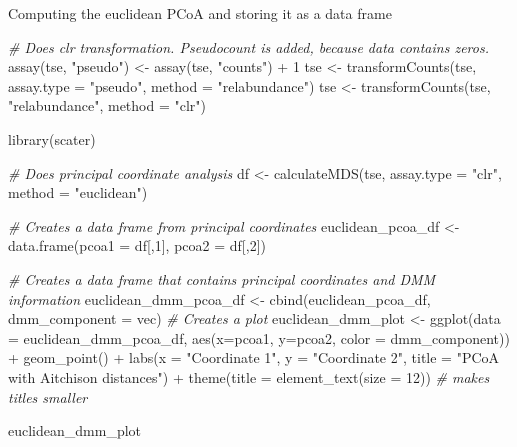 \documentclass[
]{book}
\newenvironment{Shaded}{\begin{snugshade}}{\end{snugshade}}
\newcommand{\AttributeTok}[1]{\textcolor[rgb]{0.77,0.63,0.00}{#1}}
\newcommand{\CommentTok}[1]{\textcolor[rgb]{0.56,0.35,0.01}{\textit{#1}}}
\newcommand{\DecValTok}[1]{\textcolor[rgb]{0.00,0.00,0.81}{#1}}
\newcommand{\FunctionTok}[1]{\textcolor[rgb]{0.00,0.00,0.00}{#1}}
\newcommand{\NormalTok}[1]{#1}
\newcommand{\OtherTok}[1]{\textcolor[rgb]{0.56,0.35,0.01}{#1}}
\newcommand{\SpecialCharTok}[1]{\textcolor[rgb]{0.00,0.00,0.00}{#1}}
\newcommand{\StringTok}[1]{\textcolor[rgb]{0.31,0.60,0.02}{#1}}
\begin{document}
Computing the euclidean PCoA and storing it as a data frame

\begin{Shaded}
\begin{Highlighting}[]
\CommentTok{\# Does clr transformation. Pseudocount is added, because data contains zeros.}
\FunctionTok{assay}\NormalTok{(tse, }\StringTok{"pseudo"}\NormalTok{) }\OtherTok{\textless{}{-}} \FunctionTok{assay}\NormalTok{(tse, }\StringTok{"counts"}\NormalTok{) }\SpecialCharTok{+} \DecValTok{1}
\NormalTok{tse }\OtherTok{\textless{}{-}} \FunctionTok{transformCounts}\NormalTok{(tse, }\AttributeTok{assay.type =} \StringTok{"pseudo"}\NormalTok{, }\AttributeTok{method =} \StringTok{"relabundance"}\NormalTok{)}
\NormalTok{tse }\OtherTok{\textless{}{-}} \FunctionTok{transformCounts}\NormalTok{(tse, }\StringTok{"relabundance"}\NormalTok{, }\AttributeTok{method =} \StringTok{"clr"}\NormalTok{)}

\FunctionTok{library}\NormalTok{(scater)}

\CommentTok{\# Does principal coordinate analysis}
\NormalTok{df }\OtherTok{\textless{}{-}} \FunctionTok{calculateMDS}\NormalTok{(tse, }\AttributeTok{assay.type =} \StringTok{"clr"}\NormalTok{, }\AttributeTok{method =} \StringTok{"euclidean"}\NormalTok{)}

\CommentTok{\# Creates a data frame from principal coordinates}
\NormalTok{euclidean\_pcoa\_df }\OtherTok{\textless{}{-}} \FunctionTok{data.frame}\NormalTok{(}\AttributeTok{pcoa1 =}\NormalTok{ df[,}\DecValTok{1}\NormalTok{], }
                                \AttributeTok{pcoa2 =}\NormalTok{ df[,}\DecValTok{2}\NormalTok{])}
\end{Highlighting}
\end{Shaded}

\begin{Shaded}
\begin{Highlighting}[]
\CommentTok{\# Creates a data frame that contains principal coordinates and DMM information}
\NormalTok{euclidean\_dmm\_pcoa\_df }\OtherTok{\textless{}{-}} \FunctionTok{cbind}\NormalTok{(euclidean\_pcoa\_df,}
                               \AttributeTok{dmm\_component =}\NormalTok{ vec)}
\CommentTok{\# Creates a plot}
\NormalTok{euclidean\_dmm\_plot }\OtherTok{\textless{}{-}} \FunctionTok{ggplot}\NormalTok{(}\AttributeTok{data =}\NormalTok{ euclidean\_dmm\_pcoa\_df, }
                             \FunctionTok{aes}\NormalTok{(}\AttributeTok{x=}\NormalTok{pcoa1, }\AttributeTok{y=}\NormalTok{pcoa2,}
                                 \AttributeTok{color =}\NormalTok{ dmm\_component)) }\SpecialCharTok{+}
  \FunctionTok{geom\_point}\NormalTok{() }\SpecialCharTok{+}
  \FunctionTok{labs}\NormalTok{(}\AttributeTok{x =} \StringTok{"Coordinate 1"}\NormalTok{,}
       \AttributeTok{y =} \StringTok{"Coordinate 2"}\NormalTok{,}
       \AttributeTok{title =} \StringTok{"PCoA with Aitchison distances"}\NormalTok{) }\SpecialCharTok{+}  
  \FunctionTok{theme}\NormalTok{(}\AttributeTok{title =} \FunctionTok{element\_text}\NormalTok{(}\AttributeTok{size =} \DecValTok{12}\NormalTok{)) }\CommentTok{\# makes titles smaller}

\NormalTok{euclidean\_dmm\_plot}
\end{Highlighting}
\end{Shaded}
\end{document}

